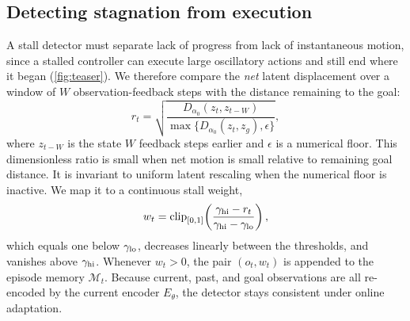\subsection{Detecting stagnation from execution}
\label{sec:trigger}
A stall detector must separate lack of progress from lack of instantaneous motion, since a stalled controller can execute large oscillatory actions and still end where it began (\cref{fig:teaser}). We therefore compare the \emph{net} latent displacement over a window of $W$ observation-feedback steps with the distance remaining to the goal:
\begin{equation}
 r_t=\sqrt{\frac{D_{\alpha_0}(z_t,z_{t-W})}
 {\max\{D_{\alpha_0}(z_t,z_g),\epsilon\}}},
 \label{eq:rate}
\end{equation}
where $z_{t-W}$ is the state $W$ feedback steps earlier and $\epsilon$ is a numerical floor. This dimensionless ratio is small when net motion is small relative to remaining goal distance. It is invariant to uniform latent rescaling when the numerical floor is inactive. We map it to a continuous stall weight,
\begin{equation}
 w_t=\operatorname{clip}_{[0,1]}\!\left(
 \frac{\gamma_{\rm hi}-r_t}{\gamma_{\rm hi}-\gamma_{\rm lo}}\right),
 \label{eq:weight}
\end{equation}
which equals one below $\gamma_{\rm lo}$, decreases linearly between the thresholds, and vanishes above $\gamma_{\rm hi}$. Whenever $w_t>0$, the pair $(o_t,w_t)$ is appended to the episode memory $\mathcal M_t$. Because current, past, and goal observations are all re-encoded by the current encoder $E_\theta$, the detector stays consistent under online adaptation.

